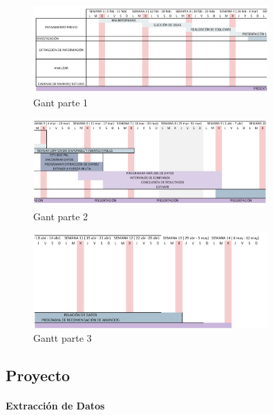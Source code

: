 \documentclass[
  letterpaper,
  DIV=11,
  numbers=noendperiod]{scrartcl}
\let\oldparagraph\paragraph
\renewcommand{\paragraph}[1]{\oldparagraph{#1}\mbox{}}
\begin{document}
\begin{figure}[htbp]
    \centering
    \includegraphics[width=0.8\textwidth, height=0.4\textheight]{gant1.png}
    \caption{Gant parte 1}
    \label{fig:gant1}
\end{figure}

\begin{figure}[htbp]
    \centering
    \includegraphics[width=0.8\textwidth, height=0.4\textheight]{gant2.png}
    \caption{Gant parte 2}
    \label{fig:gant2}
\end{figure}

\begin{figure}[htbp]
    \centering
    \includegraphics[width=0.8\textwidth, height=0.4\textheight]{gant3.png}
    \caption{Gantt parte 3}
    \label{fig:gantt3}
\end{figure}

\newpage{}

\subsection{Proyecto}\label{proyecto}

\paragraph{Extracción de Datos}\label{extracciuxf3n-de-datos-1}
\end{document}
